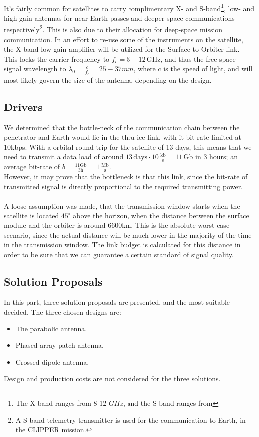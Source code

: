 \\
It's fairly common for satellites to carry complimentary X- and S-band\footnote{The X-band ranges from 8-12 $GHz$, and the S-band ranges from }, low- and high-gain antennas for near-Earth passes and deeper space communications respectively\footnote{A S-band telemetry transmitter is used for the communication to Earth, in the CLIPPER mission.}. This is also due to their allocation for deep-space mission communication. In an effort to re-use some of the instruments on the satellite, the X-band low-gain amplifier will be utilized for the Surface-to-Orbiter link. This locks the carrier frequency to $f_c=8-12\,\mathrm{GHz}$, and thus the free-space signal wavelength to $\lambda_0=\frac{c}{f_c}=25-37mm$, where c is the speed of light, and will most likely govern the size of the antenna, depending on the design.
\subsection{Drivers}
We determined that the bottle-neck of the communication chain between the penetrator and Earth would lie in the thru-ice link, with it bit-rate limited at 10kbps. With a orbital round trip for the satellite of 13 days, this means that we need to transmit a data load of around $13\,\mathrm{days}\cdot 10\, \mathrm{\frac{kb}{s}}=11\,\mathrm{Gb}$ in 3 hours; an average bit-rate of $b=\frac{11\mathrm{Gb}}{3\mathrm{h}}=1\,\mathrm{\frac{Mb}{s}}$.\\
However, it may prove that the bottleneck is that this link, since the bit-rate of transmitted signal is directly proportional to the required transmitting power.\\
\\
A loose assumption was made, that the transmission window starts when the satellite is located $45^\circ$ above the horizon, when the distance between the surface module and the orbiter is around 6600km. This is the absolute worst-case scenario, since the actual distance will be much lower in the majority of the time in the transmission window. The link budget is calculated for this distance in order to be sure that we can guarantee a certain standard of signal quality.
\subsection{Solution Proposals}
In this part, three solution proposals are presented, and the most suitable decided. The three chosen designs are:
\begin{itemize}
\item The parabolic antenna.
\item Phased array patch antenna.
\item Crossed dipole antenna. 
\end{itemize}
Design and production costs are not considered for the three solutions. 
